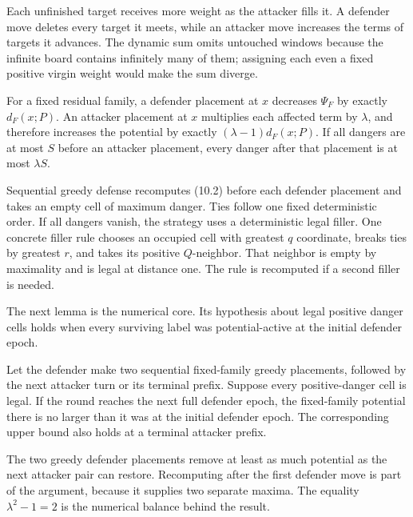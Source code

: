 \begin{plainterms}
Each unfinished target receives more weight as the attacker fills it.  A
defender move deletes every target it meets, while an attacker move increases
the terms of targets it advances.  The dynamic sum omits untouched windows
because the infinite board contains infinitely many of them; assigning each
even a fixed positive virgin weight would make the sum diverge.
\end{plainterms}

For a fixed residual family, a defender placement at $x$ decreases
$\Psi_F$ by exactly $d_F(x;P)$.  An attacker placement at $x$ multiplies each
affected term by $\lambda$, and therefore increases the potential by exactly
$(\lambda-1)d_F(x;P)$.  If all dangers are at most $S$ before an attacker
placement, every danger after that placement is at most $\lambda S$.

Sequential greedy defense recomputes \textup{(10.2)} before each defender
placement and takes an empty cell of maximum danger.  Ties follow one fixed
deterministic order.  If all dangers vanish, the strategy uses a deterministic
legal filler.  One concrete filler rule chooses an occupied cell with greatest
$q$ coordinate, breaks ties by greatest $r$, and takes its positive
$Q$-neighbor.  That neighbor is empty by maximality and is legal at distance
one.  The rule is recomputed if a second filler is needed.

The next lemma is the numerical core.  Its hypothesis about legal positive
danger cells holds when every surviving label was potential-active at the
initial defender epoch.

\begin{lemma}
\label{lem:ES-round}
Let the defender make two sequential fixed-family greedy placements, followed
by the next attacker turn or its terminal prefix.  Suppose every
positive-danger cell is legal.  If the round reaches the next full defender
epoch, the fixed-family potential there is no larger than it was at the
initial defender epoch.  The corresponding upper bound also holds at a
terminal attacker prefix.
\end{lemma}

\begin{plainterms}
The two greedy defender placements remove at least as much potential as the
next attacker pair can restore.  Recomputing after the first defender move is
part of the argument, because it supplies two separate maxima.  The equality
$\lambda^2-1=2$ is the numerical balance behind the result.
\end{plainterms}

